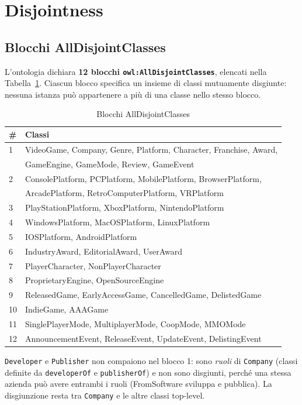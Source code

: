 \section{Disjointness}
\label{sec:disjointness}

\subsection{Blocchi AllDisjointClasses}

L'ontologia dichiara \textbf{12 blocchi \texttt{owl:AllDisjointClasses}}, elencati
nella Tabella~\ref{tab:disjoint}. Ciascun blocco specifica un insieme di classi
mutuamente disgiunte: nessuna istanza pu\`o appartenere a pi\`u di una classe
nello stesso blocco.

\begin{table}[h]
\centering
\caption{Blocchi AllDisjointClasses}
\label{tab:disjoint}
\begin{tabular}{ll}
\toprule
\textbf{\#} & \textbf{Classi} \\
\midrule
1 & VideoGame, Company, Genre, Platform, Character, Franchise, Award, \\
  & GameEngine, GameMode, Review, GameEvent \\
2 & ConsolePlatform, PCPlatform, MobilePlatform, BrowserPlatform, \\
  & ArcadePlatform, RetroComputerPlatform, VRPlatform \\
3 & PlayStationPlatform, XboxPlatform, NintendoPlatform \\
4 & WindowsPlatform, MacOSPlatform, LinuxPlatform \\
5 & IOSPlatform, AndroidPlatform \\
6 & IndustryAward, EditorialAward, UserAward \\
7 & PlayerCharacter, NonPlayerCharacter \\
8 & ProprietaryEngine, OpenSourceEngine \\
9 & ReleasedGame, EarlyAccessGame, CancelledGame, DelistedGame \\
10& IndieGame, AAAGame \\
11& SinglePlayerMode, MultiplayerMode, CoopMode, MMOMode \\
12& AnnouncementEvent, ReleaseEvent, UpdateEvent, DelistingEvent \\
\bottomrule
\end{tabular}
\end{table}

\texttt{Developer} e \texttt{Publisher} non compaiono nel blocco 1: sono \emph{ruoli} di \texttt{Company} (classi definite da \texttt{developerOf} e \texttt{publisherOf})
e non sono disgiunti, perch\'e una stessa azienda pu\`o avere entrambi i ruoli (FromSoftware sviluppa e pubblica).
La disgiunzione resta tra \texttt{Company} e le altre classi top-level.

